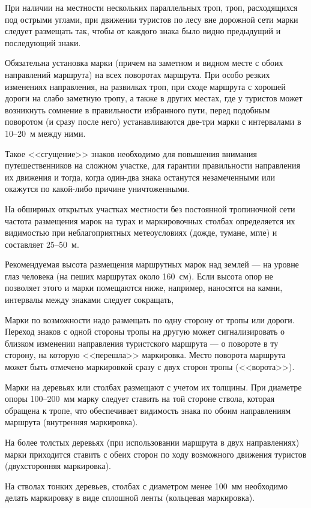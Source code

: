 \documentclass[a4paper,12pt]{extarticle}
\begin{document}
При наличии на местности нескольких параллельных троп, троп, расходящихся под острыми углами, при движении туристов по
лесу вне дорожной сети марки следует размещать так, чтобы от каждого знака было видно предыдущий и последующий знаки.

Обязательна установка марки (причем на заметном и видном месте с обоих направлений маршрута) на всех поворотах маршрута.
При особо резких изменениях направления, на развилках троп, при сходе маршрута с хорошей дороги на слабо заметную тропу,
а также в других местах, где у туристов может возникнуть сомнение в правильности избранного пути, перед подобным
поворотом (и сразу после него) устанавливаются две-три марки с интервалами в 10--20~м между ними.

Такое <<сгущение>> знаков необходимо для повышения внимания путешественников на сложном участке, для гарантии правильности
направления их движения и тогда, когда один-два знака останутся незамеченными или окажутся по какой-либо причине
уничтоженными.

На обширных открытых участках местности без постоянной тропиночной сети частота размещения марок на турах и
маркировочных столбах определяется их видимостью при неблагоприятных метеоусловиях (дожде, тумане, мгле) и составляет
25--50~м.

Рекомендуемая высота размещения маршрутных марок над землей --- на уровне глаз человека (на пеших маршрутах около 160~см).
Если высота опор не позволяет этого и марки помещаются ниже, например, наносятся на камни, интервалы между знаками
следует сокращать,

Марки по возможности надо размещать по одну сторону от тропы или дороги. Переход знаков с одной стороны тропы на другую
может сигнализировать о близком изменении направления туристского маршрута --- о повороте в ту сторону, на которую
<<перешла>> маркировка. Место поворота маршрута может быть отмечено маркировкой сразу с двух сторон тропы (<<ворота>>).

Марки на деревьях или столбах размещают с учетом их толщины. При диаметре опоры 100--200~мм марку следует ставить на той
стороне ствола, которая обращена к тропе, что обеспечивает видимость знака по обоим направлениям маршрута (внутренняя
маркировка).

На более толстых деревьях (при использовании маршрута в двух направлениях) марки приходится ставить с обеих сторон по
ходу возможного движения туристов (двухсторонняя маркировка).

На стволах тонких деревьев, столбах с диаметром менее 100~мм необходимо делать маркировку в виде сплошной ленты
(кольцевая маркировка).
\end{document}
